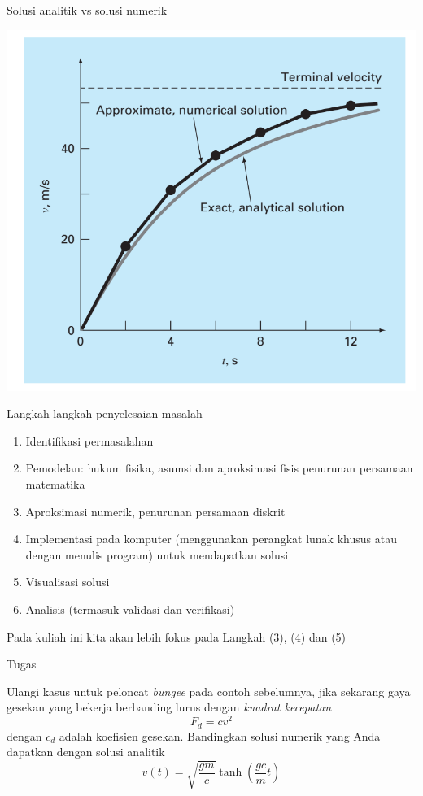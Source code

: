 \begin{frame}{Solusi analitik vs solusi numerik}

{\centering
\includegraphics[height=0.8\textheight]{../chapra_7th/Chapra_Fig_1_5.png}
\par}

\end{frame}



\begin{frame}{Langkah-langkah penyelesaian masalah}

\begin{enumerate}
[(1)]
\item
  Identifikasi permasalahan
\item
  Pemodelan: hukum fisika, asumsi dan aproksimasi fisis penurunan
  persamaan matematika
\item
  Aproksimasi numerik, penurunan persamaan diskrit
\item
  Implementasi pada komputer (menggunakan perangkat lunak khusus atau
  dengan menulis program) untuk mendapatkan solusi
\item
  Visualisasi solusi
\item
  Analisis (termasuk validasi dan verifikasi)
\end{enumerate}

Pada kuliah ini kita akan lebih fokus pada Langkah (3), (4) dan (5)
\end{frame}




\begin{frame}{Tugas}

Ulangi kasus untuk peloncat \emph{bungee} pada contoh sebelumnya, jika
sekarang gaya gesekan yang bekerja berbanding lurus dengan \emph{kuadrat
kecepatan} \[
F_{d} = c v^2
\] dengan \(c_d\) adalah koefisien gesekan. Bandingkan solusi numerik
yang Anda dapatkan dengan solusi analitik \[
v(t) = \sqrt{\frac{g m}{c}}\tanh\left( \frac{g c}{m} t \right)
\]
\end{frame}




